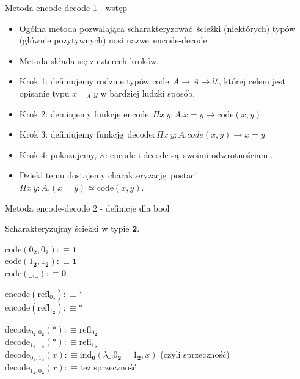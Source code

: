 \documentclass{beamer}
\newcommand{\defn}{:\equiv}
\newcommand{\U}{\mathcal{U}}
\newcommand{\refl}[1]{\text{refl}_{#1}}
\newcommand{\code}{\text{code}}
\newcommand{\encode}{\text{encode}}
\newcommand{\decode}{\text{decode}}
\begin{document}
\begin{frame}{Metoda encode-decode 1 - wstęp}
\begin{itemize}
	\item Ogólna metoda pozwalająca scharakteryzować ścieżki (niektórych) typów  (głównie pozytywnych) nosi nazwę encode-decode.
	\item Metoda składa się z czterech kroków.
	\item Krok 1: definiujemy rodzinę typów $\code : A \to A \to \U$, której celem jest opisanie typu $x =_A y$ w bardziej ludzki sposób.
	\item Krok 2: deiniujemy funkcję $\encode : \Pi x\ y : A. x = y \to \code(x, y)$
	\item Krok 3: definiujemy funkcję $\decode : \Pi x\ y : A. code(x, y) \to x = y$
	\item Krok 4: pokazujemy, że $\encode$ i $\decode$ są swoimi odwrotnościami.
	\item Dzięki temu dostajemy charakteryzację postaci $\Pi x\ y : A. (x = y) \simeq \code(x, y)$.
\end{itemize}
\end{frame}

\begin{frame}{Metoda encode-decode 2 - definicje dla bool}
	
Scharakteryzujmy ścieżki w typie $\mathbf{2}$.

\begin{definition}[$\code$]
$\code(0_\mathbf{2}, 0_\mathbf{2}) \defn \mathbf{1}$ \\
$\code(1_\mathbf{2}, 1_\mathbf{2}) \defn \mathbf{1}$ \\
$\code(\_, \_) \defn \mathbf{0}$
\end{definition}

\begin{definition}[$\encode$]
$\encode(\refl{0_\mathbf{2}}) \defn *$ \\
$\encode(\refl{1_\mathbf{2}}) \defn *$
\end{definition}

\begin{definition}[$\decode$]
$\decode_{0_\mathbf{2}, 0_\mathbf{2}}(*) \defn \refl{0_\mathbf{2}}$ \\
$\decode_{1_\mathbf{2}, 1_\mathbf{2}}(*) \defn \refl{1_\mathbf{2}}$ \\
$\decode_{0_\mathbf{2}, 1_\mathbf{2}}(x) \defn \text{ind}_\mathbf{0}(\lambda \_. 0_\mathbf{2} = 1_\mathbf{2}, x)$ (czyli sprzeczność) \\
$\decode_{1_\mathbf{2}, 0_\mathbf{2}}(x) \defn \text{też sprzeczność}$
\end{definition}

\end{frame}
\end{document}
